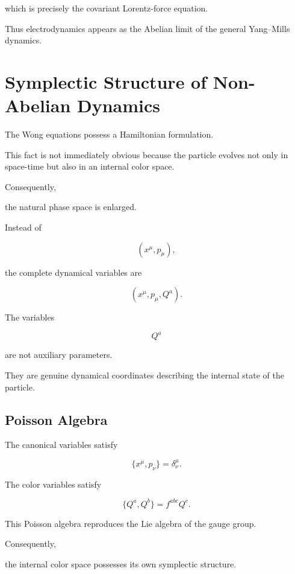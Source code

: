 which is precisely the covariant Lorentz-force equation.

Thus electrodynamics appears as the Abelian limit of the general
Yang--Mills dynamics.



\section{Symplectic Structure of Non-Abelian Dynamics}

The Wong equations possess a Hamiltonian formulation.

This fact is not immediately obvious because the particle evolves not
only in space-time but also in an internal color space.

Consequently,

the natural phase space is enlarged.

Instead of

\[
(x^\mu,p_\mu),
\]

the complete dynamical variables are

\[
\boxed{
(x^\mu,p_\mu,Q^a).
}
\]

The variables

\[
Q^a
\]

are not auxiliary parameters.

They are genuine dynamical coordinates describing the internal state of
the particle.


\subsection{Poisson Algebra}

The canonical variables satisfy

\[
\{x^\mu,p_\nu\}
=
\delta^\mu_\nu .
\]

The color variables satisfy

\[
\boxed{
\{Q^a,Q^b\}
=
f^{abc}Q^c.
}
\]

This Poisson algebra reproduces the Lie algebra of the gauge group.

Consequently,

the internal color space possesses its own symplectic structure.


